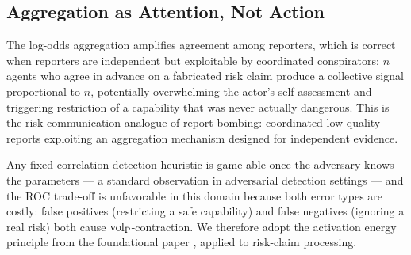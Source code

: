 \subsection{Aggregation as Attention, Not Action}
\label{sec:attention_not_action}

The log-odds aggregation amplifies agreement among reporters, which is
correct when reporters are independent but exploitable by coordinated
conspirators: $n$ agents who agree in advance on a fabricated risk claim
produce a collective signal proportional to $n$, potentially overwhelming
the actor's self-assessment and triggering restriction of a capability that
was never actually dangerous. This is the risk-communication analogue of
report-bombing: coordinated low-quality reports exploiting an aggregation
mechanism designed for independent evidence.

Any fixed correlation-detection heuristic is game-able once the adversary
knows the parameters --- a standard observation in adversarial detection
settings --- and the ROC trade-off is unfavorable in this domain because
both error types are costly: false positives (restricting a safe
capability) and false negatives (ignoring a real risk) both cause
${\operatorname{vol}_{\mathrm{P}}}$-contraction. We therefore adopt the activation
energy principle from the foundational paper \citep{lasser2026gfm}, applied
to risk-claim processing.

